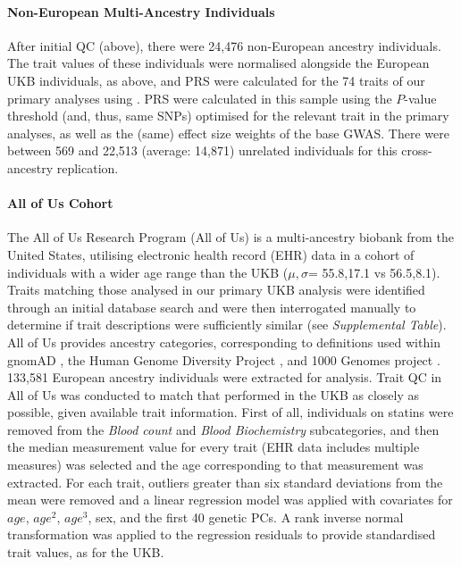 \documentclass[12pt]{zHenriquesLab-StyleBioRxiv}
\begin{document}
%
\paragraph*{Non-European Multi-Ancestry Individuals}
After initial QC (above), there were 24,476 non-European ancestry individuals. The trait values of 
these individuals were normalised alongside the European UKB individuals, as above, and PRS 
were calculated for the 74 traits of our primary analyses using \cite{prsice}. 
PRS were calculated in this sample using the $P$-value threshold (and, thus, same SNPs) 
optimised for the relevant trait in the primary analyses, as well as the (same) effect 
size weights of the base GWAS. There were between 569 and 22,513 (average: 14,871) unrelated 
individuals for this cross-ancestry replication. 
%
\paragraph*{All of Us Cohort}
The All of Us Research Program (All of Us) is a multi-ancestry biobank from the United States, utilising 
electronic health record (EHR) data in a cohort of individuals with a wider age 
range than the UKB ($\mu,\sigma$= 55.8,17.1 vs 56.5,8.1). 
Traits matching those analysed in our primary UKB analysis 
were identified through an initial database search and were 
then interrogated manually to determine if trait descriptions 
were sufficiently similar (see \textit{Supplemental Table}).  
All of Us provides ancestry categories, corresponding to definitions 
used within gnomAD \cite{gnomad}, 
the Human Genome Diversity Project \cite{hgdp}, 
and 1000 Genomes project \cite{tgp}.  
133,581  European ancestry individuals were extracted for analysis. %
Trait QC in All of Us was conducted to match that performed in the UKB as closely as possible, given 
available trait information. First of all, individuals on statins were removed 
from the \textit{Blood count} and \textit{Blood Biochemistry} subcategories, and then the median measurement value for every trait (EHR data includes multiple measures) was selected and 
the age corresponding to that measurement was extracted. For each trait, outliers greater 
than six standard deviations from the mean were removed and a linear regression model was 
applied with covariates for $age$, $age^2$, $age^3$, sex, and the first 40 genetic PCs. A rank inverse normal transformation was applied to the regression residuals to provide standardised trait values, as for the UKB.
\end{document}
